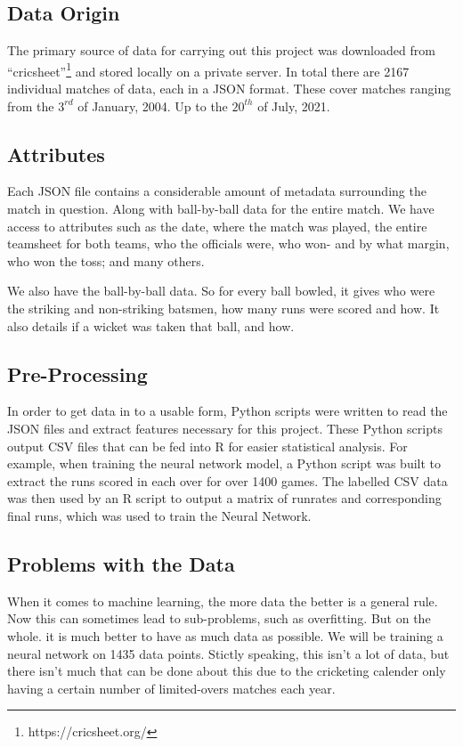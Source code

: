\documentclass[11pt]{amsart}
\begin{document}
\subsection{Data Origin}
The primary source of data for carrying out this project was downloaded from ``cricsheet''\footnote{https://cricsheet.org/}
and stored locally on a private server. In total there are 2167 individual matches of data, each in a JSON format.
These cover matches ranging from the $3^{rd}$ of January, 2004. Up to the $20^{th}$ of July, 2021.

\subsection{Attributes}
Each JSON file contains a considerable amount of metadata surrounding the match in question. Along with 
ball-by-ball data for the entire match. We have access to attributes such as the date, where the match was played,
the entire teamsheet for both teams, who the officials were, who won- and by what margin, who won the toss; and many others.

We also have the ball-by-ball data. So for every ball bowled, it gives who were the striking and non-striking batsmen, how many runs
were scored and how. It also details if a wicket was taken that ball, and how.

\subsection{Pre-Processing}
In order to get data in to a usable form, Python scripts were written to read the JSON files and extract features necessary for this project.
These Python scripts output CSV files that can be fed into R for easier statistical analysis. For example, when training the neural network model,
a Python script was built to extract the runs scored in each over for over 1400 games. The labelled CSV data was then used by an R script to 
output a matrix of runrates and corresponding final runs, which was used to train the Neural Network.

\subsection{Problems with the Data}
When it comes to machine learning, the more data the better is a general rule. Now this can sometimes lead to sub-problems, such as overfitting. But on the whole.
it is much better to have as much data as possible. We will be training a neural network on 1435 data points. Stictly speaking, this isn't a lot of data, but there
isn't much that can be done about this due to the cricketing calender only having a certain number of limited-overs matches each year.
\end{document}
